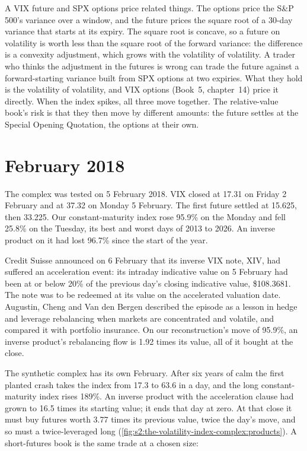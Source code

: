 A VIX future and SPX options price related things. The options price the S\&P 500's variance over a window, and the future prices the square root of
a 30-day variance that starts at its expiry. The square root is concave, so a future on volatility is worth less than the square root of the forward
variance: the difference is a convexity adjustment, which grows with the volatility of volatility. A trader who thinks the adjustment in the futures
is wrong can trade the future against a forward-starting variance built from SPX options at two expiries. What they hold is the volatility of
volatility, and VIX options (Book~5, chapter~14) price it directly. When the index spikes, all three move together. The relative-value book's risk is
that they then move by different amounts: the future settles at the Special Opening Quotation, the options at their own.

\section{February 2018}

The complex was tested on 5 February 2018. VIX closed at 17.31 on Friday 2 February and at 37.32 on Monday 5 February. The first future settled at
15.625, then 33.225. Our constant-maturity index rose 95.9\% on the Monday and fell 25.8\% on the Tuesday, its best and worst days of 2013 to 2026. An
inverse product on it had lost 96.7\% since the start of the year.

Credit Suisse announced on 6 February that its inverse VIX note, XIV, had suffered an acceleration event: its intraday indicative value on 5 February
had been at or below 20\% of the previous day's closing indicative value, \$108.3681. The note was to be redeemed at its value on the accelerated
valuation date. Augustin, Cheng and Van den Bergen described the episode as a lesson in hedge and leverage rebalancing when markets are concentrated
and volatile, and compared it with portfolio insurance. On our reconstruction's move of 95.9\%, an inverse product's rebalancing flow is 1.92 times its value, all of it
bought at the close.

The synthetic complex has its own February. After six years of calm the first planted crash takes the index from 17.3 to 63.6 in a day, and the long
constant-maturity index rises 189\%. An inverse product with the acceleration clause had grown to 16.5 times its starting value; it ends that day at
zero. At that close it must buy futures worth 3.77 times its previous value, twice the day's move, and so must a twice-leveraged long
(\cref{fig:s2:the-volatility-index-complex:products}). A short-futures book is the same trade at a chosen size:

